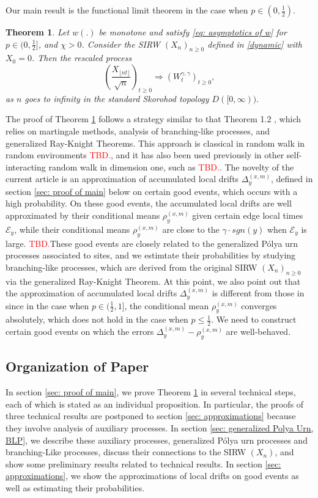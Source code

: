 \documentclass[twoside,12pt,a4paper]{article}
\newtheorem{theorem}{Theorem}[section]
\numberwithin{equation}{section}
\newcommand\TBD{\textcolor{red}{TBD.}}
\begin{document}
	Our main result is the functional limit theorem in the case when $p\in (0,\frac{1}{2})$.
	\begin{theorem}\label{thm: main}
		Let $w(.)$ be monotone and satisfy \eqref{eq: asymptotics of w} for $p\in (0,\frac{1}{2}]$, and $\mathcal{\chi} >0 $. Consider the SIRW $(X_n)_{n\geq 0}$ defined in \eqref{dynamic} with $X_0 =0$. Then the rescaled process
		$$
		\left(  \frac{X_{\lfloor nt \rfloor }}{\sqrt{n}}  \right)_{t\geq 0} \Longrightarrow \left( W^{\gamma,\gamma}_{t}\right)_{t\geq 0},
		$$ as $n$ goes to infinity in the standard Skorohod topology $D([0,\infty) ).$
	\end{theorem}
	The proof of Theorem \ref{thm: main} follows a strategy similar to that Theorem 1.2 \cite{KMP22}, which relies on martingale methods, analysis of branching-like processes, and generalized Ray-Knight Theorems. This approach is classical in random walk in random environments \TBD, and it has also been used previously in other self-interacting random walk in dimension one, such as \TBD. The novelty of the current article is an approximation of accumulated local drifts $\Delta_y^{(x,m)}$, defined in section \ref{sec: proof of main} below on certain good events, which occurs with a high probability. On these good events, the accumulated local drifts are well approximated by their conditional means $\rho_{y}^{(x,m)}$ given certain edge local times $\mathcal{E}_y$, while their conditional means $\rho_{y}^{(x,m)}$ are close to the $\gamma \cdot sgn(y)$ when  $\mathcal{E}_y$ is large. \TBD These good events are closely related to the generalized P\'{o}lya  urn processes associated to sites, and we estimtate their probabilities by studying branching-like processes, which are derived from the original SIRW $(X_n)_{n\geq 0}$ via the generalized Ray-Knight Theorem. At this point, we also point out that the approximation of accumulated local drifts $\Delta_y^{(x,m)}$ is different from those in \cite{KMP22} since in the case when $p\in(\frac{1}{2},1]$, the conditional mean $\rho_{y}^{(x,m)}$ converges absolutely, which does not hold in the case when $p\leq \frac{1}{2}$. We need to construct certain good events on which the errors $\Delta_y^{(x,m)}- \rho_y^{(x,m)}$ are well-behaved.
	
	\subsection{Organization of Paper}
	In section \ref{sec: proof of main}, we prove Theorem \ref{thm: main} in several technical steps, each of which is stated as an individual proposition. In particular, the proofs of three technical results are postponed to section \ref{sec: approximations} because they involve analysis of auxiliary processes. In section \ref{sec: generalized Polya Urn, BLP}, we describe these auxiliary processes, generalized P\'{o}lya urn processes and branching-Like processes, discuss their connections to the SIRW $(X_n)$, and show some preliminary results related to technical results. In section \ref{sec: approximations}, we show the approximations of local drifts on good events as well as estimating their probabilities. 
	
\end{document}
